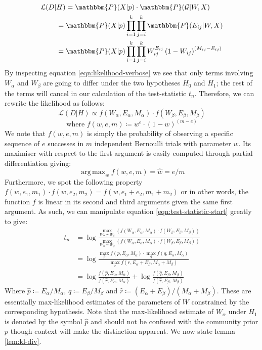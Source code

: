 \documentclass[]{article}
\DeclareMathOperator*{\argmax}{arg\,max}
\newcommand{\Gcal}{\mathcal{G}}
\newcommand{\lik}{\mathcal{L}}
\newcommand{\prob}{\mathbbm{P}}
\begin{document}
\begin{multicols*}{2}
%
\begin{align}
\lik(D | &H) = \prob(X| p) \cdot \prob(\Gcal | W, X) \nonumber \\
&= \prob(X | p) \prod_{i=1}^{k} \prod_{j=i}^{k} \prob(E_{ij} | W, X) \nonumber \\
&= \prob(X | p) \prod_{i=1}^{k} \prod_{j=i}^{k} W_{ij} ^ {E_{ij}} \left( 1 - W_{ij} \right) ^ {(M_{ij} - E_{ij})}
\label{eqn:likelihood-verbose}
\end{align}
%
By inspecting equation \ref{eqn:likelihood-verbose} we see that only terms involving $W_{\alpha}$ and $W_{\beta}$ are going to differ under the two hypotheses $H_0$ and $H_1$; the rest of the terms will cancel in our calculation of the test-statistic $t_n$. Therefore, we can rewrite the likelihood as follows:
%
\begin{equation}
	\lik (D | H) \propto f (W_\alpha, E_\alpha, M_\alpha) \cdot f (W_\beta, E_\beta, M_\beta)
\end{equation} 
\begin{equation}
	\textrm{where } f (w, e, m) \coloneqq w^e \cdot (1-w)^{(m - e)}
	\label{eqn:f-defn}
\end{equation}
%
We note that $f(w, e, m)$ is simply the probability of observing a specific sequence of $e$ successes in $m$ independent Bernoulli trials with parameter $w$. Its maximiser with respect to the first argument is easily computed through partial differentiation giving:
%
\begin{equation}
	\argmax_w f(w, e, m) = \hat{w} = e / m
	\label{eqn:f-maximiser}
\end{equation}
%
Furthermore, we spot the following property $f(w, e_1, m_1) \cdot f(w, e_2, m_2) = f(w, e_1 + e_2, m_1 + m_2)$ or in other words, the function $f$ is linear in its second and third arguments given the same first argument. As such, we can manipulate equation \ref{eqn:test-statistic-start} greatly to give:
%
\begin{align}
	t_n &= \log \frac
	{
		\max_{W_{\alpha} \neq W_{\beta}}(f (W_\alpha, E_\alpha, M_\alpha) \cdot f (W_\beta, E_\beta, M_\beta))
	}
	{
		\max_{W_\alpha = W_\beta} (f (W_\alpha, E_\alpha, M_\alpha) \cdot f (W_\beta, E_\beta, M_\beta))
	} \nonumber \\
	&= \log \frac{
		\max_p f(p, E_\alpha, M_\alpha) \cdot \max_q f(q, E_\alpha, M_\alpha)
	}{
		\max_r f(r, E_\alpha + E_\beta, M_\alpha + M_\beta)
	} \nonumber \\
	&= \log \frac{f(\hat{p}, E_\alpha, M_\alpha)}{f(\hat{r}, E_\alpha, M_\alpha)} + \log \frac{f(\hat{q}, E_\beta, M_\beta)}{f(\hat{r}, E_\beta, M_\beta)}
\end{align}
%
Where $\hat{p} \coloneqq E_\alpha / M_\alpha$, $\hat{q} \coloneqq E_\beta / M_\beta$ and $\hat{r} \coloneqq (E_\alpha + E_\beta) / (M_\alpha + M_\beta)$. These are essentially max-likelihood estimates of the parameters of $W$ constrained by the corresponding hypothesis. Note that the max-likelihood estimate of $W_\alpha$ under $H_1$ is denoted by the symbol $\hat{p}$ and should not be confused with the community prior $p$ though context will make the distinction apparent. We now state lemma \ref{lem:kl-div}.


\end{multicols*}
\end{document}
